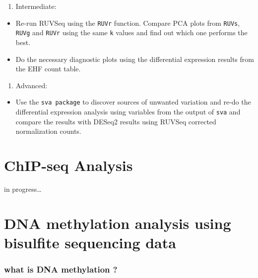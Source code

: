 \documentclass[12pt,]{krantz}
\providecommand{\tightlist}{%
  \setlength{\itemsep}{0pt}\setlength{\parskip}{0pt}}
\begin{document}
\begin{enumerate}
\def\labelenumi{\arabic{enumi}.}
\setcounter{enumi}{1}
\tightlist
\item
  Intermediate:
\end{enumerate}

\begin{itemize}
\item
  Re-run RUVSeq using the \texttt{RUVr} function. Compare PCA plots from \texttt{RUVs}, \texttt{RUVg} and \texttt{RUVr} using the same \texttt{k} values and find out which one performs the best.
\item
  Do the necessary diagnostic plots using the differential expression results from the EHF count table.
\end{itemize}

\begin{enumerate}
\def\labelenumi{\arabic{enumi}.}
\setcounter{enumi}{2}
\tightlist
\item
  Advanced:
\end{enumerate}

\begin{itemize}
\tightlist
\item
  Use the \texttt{sva\ package} to discover sources of unwanted variation and re-do the differential expression analysis using variables from the output of \texttt{sva} and compare the results with DESeq2 results using RUVSeq corrected normalization counts.
\end{itemize}

\hypertarget{chipseq}{%
\chapter{ChIP-seq Analysis}\label{chipseq}}

in progress\ldots{}

\hypertarget{bsseq}{%
\chapter{DNA methylation analysis using bisulfite sequencing data}\label{bsseq}}

\hypertarget{what-is-dna-methylation}{%
\subsection{what is DNA methylation ?}\label{what-is-dna-methylation}}
\end{document}
